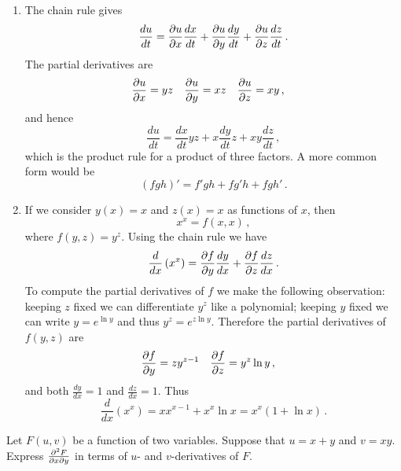 \begin{solution}
\begin{enumerate}
\item
The chain rule gives
\[
\frac{du}{dt} = \frac{\partial u}{\partial x}\frac{dx}{dt}
+ \frac{\partial u}{\partial y}\frac{dy}{dt}
+ \frac{\partial u}{\partial z}\frac{dz}{dt} \,.
\]
The partial derivatives are
\begin{align*}
\frac{\partial u}{\partial x} &= yz &
\frac{\partial u}{\partial y} &= xz &
\frac{\partial u}{\partial z} &= xy\,,
\end{align*}
and hence
\[
\frac{du}{dt} = \frac{dx}{dt} yz
+ x \frac{dy}{dt} z
+ xy\frac{dz}{dt} \,,
\]
which is the product rule for a product of three factors. A more common form would be
\[
(fgh)' = f' gh + fg'h + fgh'\,.
\]
\item
If we consider $y(x)=x$ and $z(x)=x$ as functions of $x$, then
\[
x^x = f(x,x)\,,
\]
where $f(y,z) = y^z$. Using the chain rule we have
\[
\frac{d}{dx}\left( x^x \right) =
\frac{\partial f}{\partial y}\frac{dy}{dx} + 
\frac{\partial f}{\partial z}\frac{dz}{dx}\,.
\]
To compute the partial derivatives of $f$ we make the following observation: keeping $z$ fixed we can differentiate $y^z$ like a polynomial; keeping $y$ fixed we can write $y = e^{\ln y}$ and thus $y^z = e^{z \ln y}$. Therefore the partial derivatives of $f(y,z)$ are
\begin{align*}
\frac{\partial f}{\partial y} &= zy^{z-1} &
\frac{\partial f}{\partial z} &= y^z \ln y\,,
\end{align*}
and both $\frac{dy}{dx} = 1$ and $\frac{dz}{dx} = 1$. Thus
\[
\frac{d}{dx}\left( x^x \right) = x x^{x-1} + x^x \ln x = x^{x} \left( 1 + \ln x\right)\,.
\]
\end{enumerate}
\end{solution}

\begin{question}
Let $F(u,v)$ be a function of two variables. Suppose that $u = x+y$ and $v=xy$. Express $\frac{\partial^2 F}{\partial x \partial y}$ in terms of $u$- and $v$-derivatives of $F$.
\end{question}

